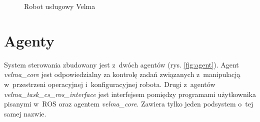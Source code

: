 	\begin{figure}
		\centering
		\hfill
		
		\caption{Robot usługowy Velma}
		\label{fig:velma}
		
	\end{figure}
	
\section{Agenty}
System sterowania \cite{bib:velma2} zbudowany jest z~dwóch agentów (rys. \ref{fig:agent}). Agent \textit{velma\_core} jest odpowiedzialny za kontrolę zadań związanych z~manipulacją w~przestrzeni operacyjnej i~konfiguracyjnej robota. Drugi z~agentów \textit{velma\_task\_cs\_ros\_interface} jest interfejsem pomiędzy programami użytkownika pisanymi w~ROS oraz agentem \textit{velma\_core}. Zawiera tylko jeden podsystem o~tej samej nazwie.


